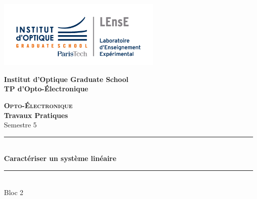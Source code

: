 \documentclass[a4paper,11pt]{article} %
\begin{document}
\begin{titlepage}

\begin{center}
	\begin{minipage}{2.5cm}
	\begin{center}
		\includegraphics[width=8cm]{images/Logo-LEnsE.png}
	\end{center}
\end{minipage}\hfill
\begin{minipage}{10cm}
	\begin{center}
	\textbf{Institut d'Optique Graduate School }\\[0.1cm]
    \textbf{TP d'Opto-Électronique}


	\end{center}
\end{minipage}\hfill


\vspace{5cm}


{\huge \bfseries \textsc{Opto-Électronique}} \\[0.5cm]
{\large \bfseries Travaux Pratiques} \\[0.2cm]
Semestre 5

\vspace{2cm}
\rule{\linewidth}{0.3mm} \\[0.4cm]
{ \huge \bfseries\color{violet_iogs} Caractériser un système linéaire \\[0.4cm] }
\rule{\linewidth}{0.3mm} \\[1cm]
{\huge Bloc 2}

\vfill


\end{center}
\end{titlepage}

\newpage
\strut %
\newpage
\pagestyle{empty}
\end{document}
